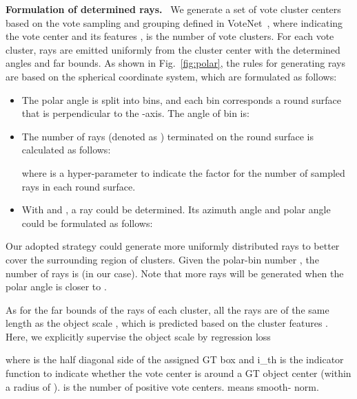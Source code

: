 \documentclass[final]{cvpr}
\begin{document}
\noindent\textbf{Formulation of determined rays.}~
We generate a set of vote cluster centers  based on the vote sampling and grouping defined in VoteNet~\cite{qi2019deep}, where  indicating the vote center  and its features , 
 is the number of vote clusters. For each vote cluster,  rays are emitted uniformly from the cluster center  with the determined angles and far bounds. As shown in Fig.~\ref{fig:polar}, the rules for generating rays are based on the spherical coordinate system, which are formulated as follows:
\vspace{-5pt}
\begin{itemize}
	\setlength{\itemsep}{0pt}
	\setlength{\parsep}{-2pt}
	\setlength{\parskip}{-0pt}
	\setlength{\leftmargin}{-10pt}
	\item The polar angle  is split into  bins, and each bin corresponds a round surface that is perpendicular to the -axis. The angle of  bin is:
		
	\item 
	The number of rays (denoted as ) terminated on the  round surface is calculated as follows: 
		 
	where  is a hyper-parameter to indicate the factor for the number of sampled rays in each round surface.
	\item With  and , a ray could be determined. Its azimuth angle   and polar angle   could be formulated as follows:
		
\end{itemize}
Our adopted strategy could generate more uniformly distributed rays to better cover the surrounding region of clusters. 
Given the polar-bin number , the number of rays is  (\ie  in our case). 
Note that more rays will be generated when the polar angle is closer to . 

As for the far bounds of the rays of each cluster, all the rays are of the same length as the object scale , which is predicted based on the cluster features . Here, we explicitly supervise the object scale  by regression loss

where  is the half diagonal side of the assigned GT box and i_{th} is the indicator function to indicate whether the vote center  is around a GT object center (within a radius of ).  is the number of positive vote centers.  means smooth- norm.
\end{document}
